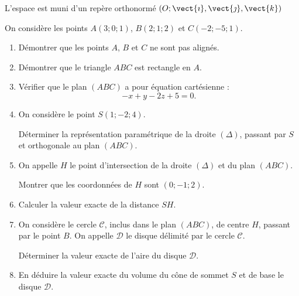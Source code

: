 L'espace est muni d'un repère orthonormé $\left(O;\vect{\imath},\vect{\jmath},\vect{k}\right)$

On considère les points $A(3;0;1)$, $B(2;1;2)$ et $C(-2;-5;1)$.

\begin{enumerate}
	\item Démontrer que les points $A$, $B$ et $C$ ne sont pas alignés.
	\item Démontrer que le triangle $ABC$ est rectangle en $A$.
	\item Vérifier que le plan $(ABC)$ a pour équation cartésienne : \[ -x + y - 2 z + 5 = 0. \]
	\item On considère le point $S(1;-2;4)$.
	
	Déterminer la représentation paramétrique de la droite $(\Delta)$, passant par $S$ et orthogonale au plan $(ABC)$.
	\item On appelle $H$ le point d'intersection de la droite $(\Delta)$ et du plan $(ABC)$.
	
	Montrer que les coordonnées de $H$ sont $(0;-1;2)$.
	\item Calculer la valeur exacte de la distance $SH$.
	\item On considère le cercle $\mathcal{C}$, inclus dans le plan $(ABC)$, de centre $H$, passant par le point $B$. On appelle $\mathcal{D}$ le disque délimité par le cercle $\mathcal{C}$.
	
	Déterminer la valeur exacte de l'aire du disque $\mathcal{D}$.
	\item En déduire la valeur exacte du volume du cône de sommet $S$ et de base le disque $\mathcal{D}$.
\end{enumerate}
